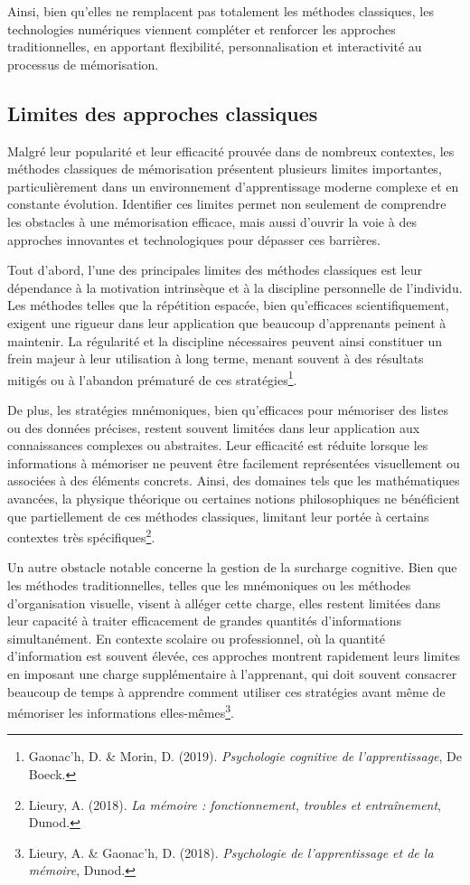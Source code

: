 \documentclass[11pt,a4paper]{report}
\begin{document}
Ainsi, bien qu’elles ne remplacent pas totalement les méthodes classiques, les technologies numériques viennent compléter et renforcer les approches traditionnelles, en apportant flexibilité, personnalisation et interactivité au processus de mémorisation.

\subsection{Limites des approches classiques}

Malgré leur popularité et leur efficacité prouvée dans de nombreux contextes, les méthodes classiques de mémorisation présentent plusieurs limites importantes, particulièrement dans un environnement d’apprentissage moderne complexe et en constante évolution. Identifier ces limites permet non seulement de comprendre les obstacles à une mémorisation efficace, mais aussi d’ouvrir la voie à des approches innovantes et technologiques pour dépasser ces barrières.

Tout d’abord, l’une des principales limites des méthodes classiques est leur dépendance à la motivation intrinsèque et à la discipline personnelle de l’individu. Les méthodes telles que la répétition espacée, bien qu’efficaces scientifiquement, exigent une rigueur dans leur application que beaucoup d’apprenants peinent à maintenir. La régularité et la discipline nécessaires peuvent ainsi constituer un frein majeur à leur utilisation à long terme, menant souvent à des résultats mitigés ou à l’abandon prématuré de ces stratégies\footnote{Gaonac'h, D. \& Morin, D. (2019). \textit{Psychologie cognitive de l'apprentissage}, De Boeck.}.

De plus, les stratégies mnémoniques, bien qu’efficaces pour mémoriser des listes ou des données précises, restent souvent limitées dans leur application aux connaissances complexes ou abstraites. Leur efficacité est réduite lorsque les informations à mémoriser ne peuvent être facilement représentées visuellement ou associées à des éléments concrets. Ainsi, des domaines tels que les mathématiques avancées, la physique théorique ou certaines notions philosophiques ne bénéficient que partiellement de ces méthodes classiques, limitant leur portée à certains contextes très spécifiques\footnote{Lieury, A. (2018). \textit{La mémoire : fonctionnement, troubles et entraînement}, Dunod.}.

Un autre obstacle notable concerne la gestion de la surcharge cognitive. Bien que les méthodes traditionnelles, telles que les mnémoniques ou les méthodes d’organisation visuelle, visent à alléger cette charge, elles restent limitées dans leur capacité à traiter efficacement de grandes quantités d'informations simultanément. En contexte scolaire ou professionnel, où la quantité d’information est souvent élevée, ces approches montrent rapidement leurs limites en imposant une charge supplémentaire à l'apprenant, qui doit souvent consacrer beaucoup de temps à apprendre comment utiliser ces stratégies avant même de mémoriser les informations elles-mêmes\footnote{Lieury, A. \& Gaonac’h, D. (2018). \textit{Psychologie de l’apprentissage et de la mémoire}, Dunod.}.
\end{document}

